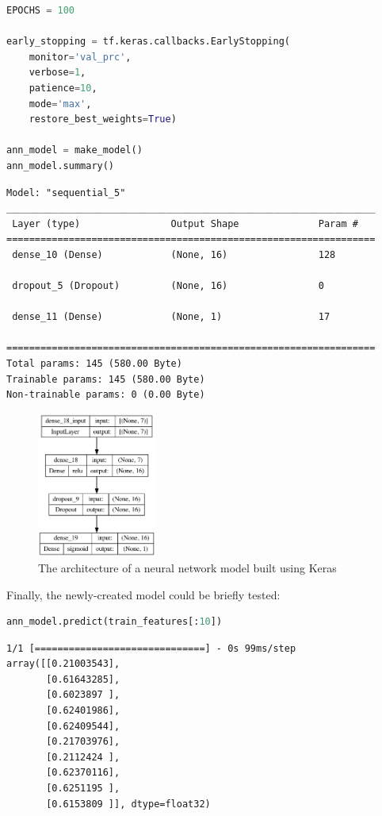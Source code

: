 \documentclass{article}
\begin{document}
\begin{lstlisting}[language=Python]
EPOCHS = 100

early_stopping = tf.keras.callbacks.EarlyStopping(
    monitor='val_prc', 
    verbose=1,
    patience=10,
    mode='max',
    restore_best_weights=True)

ann_model = make_model()
ann_model.summary()
\end{lstlisting}
\begin{verbatim}
Model: "sequential_5"
_________________________________________________________________
 Layer (type)                Output Shape              Param #   
=================================================================
 dense_10 (Dense)            (None, 16)                128       
                                                                 
 dropout_5 (Dropout)         (None, 16)                0         
                                                                 
 dense_11 (Dense)            (None, 1)                 17        
                                                                 
=================================================================
Total params: 145 (580.00 Byte)
Trainable params: 145 (580.00 Byte)
Non-trainable params: 0 (0.00 Byte)
\end{verbatim}



\begin{figure}
\centering
\includegraphics[width=0.35\textwidth]{nn_plot.png}
\caption{\label{fig:nn_plot}The architecture of a neural network model built using Keras}
\end{figure}

Finally, the newly-created model could be briefly tested:

\begin{lstlisting}[language=Python]
ann_model.predict(train_features[:10])
\end{lstlisting}
\begin{verbatim}
1/1 [==============================] - 0s 99ms/step
array([[0.21003543],
       [0.61643285],
       [0.6023897 ],
       [0.62401986],
       [0.62409544],
       [0.21703976],
       [0.2112424 ],
       [0.62370116],
       [0.6251195 ],
       [0.6153809 ]], dtype=float32)
\end{verbatim}
\end{document}
